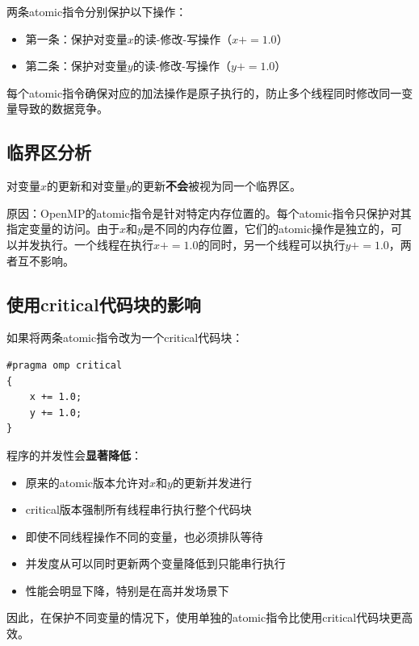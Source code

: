 两条atomic指令分别保护以下操作：
\begin{itemize}
    \item 第一条：保护对变量$x$的读-修改-写操作（$x += 1.0$）
    \item 第二条：保护对变量$y$的读-修改-写操作（$y += 1.0$）
\end{itemize}

每个atomic指令确保对应的加法操作是原子执行的，防止多个线程同时修改同一变量导致的数据竞争。

\subsection{临界区分析}

对变量$x$的更新和对变量$y$的更新\textbf{不会}被视为同一个临界区。

原因：OpenMP的atomic指令是针对特定内存位置的。每个atomic指令只保护对其指定变量的访问。由于$x$和$y$是不同的内存位置，它们的atomic操作是独立的，可以并发执行。一个线程在执行$x += 1.0$的同时，另一个线程可以执行$y += 1.0$，两者互不影响。

\subsection{使用critical代码块的影响}

如果将两条atomic指令改为一个critical代码块：

\begin{lstlisting}[style=cleancpp]
#pragma omp critical
{
    x += 1.0;
    y += 1.0;
}
\end{lstlisting}

程序的并发性会\textbf{显著降低}：

\begin{itemize}
    \item 原来的atomic版本允许对$x$和$y$的更新并发进行
    \item critical版本强制所有线程串行执行整个代码块
    \item 即使不同线程操作不同的变量，也必须排队等待
    \item 并发度从可以同时更新两个变量降低到只能串行执行
    \item 性能会明显下降，特别是在高并发场景下
\end{itemize}

因此，在保护不同变量的情况下，使用单独的atomic指令比使用critical代码块更高效。